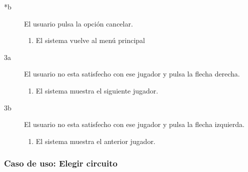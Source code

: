 \begin{description}
\begin{description}
            \item[*b ] El usuario pulsa la opción cancelar.
            \begin{enumerate}
                \item El sistema vuelve al menú principal
            \end{enumerate}
            
            \item[3a ] El usuario no esta satisfecho con ese jugador y pulsa la flecha derecha.
            \begin{enumerate}
                \item El sistema muestra el siguiente jugador.
            \end{enumerate}

            \item[3b ] El usuario no esta satisfecho con ese jugador y pulsa la flecha izquierda.
            \begin{enumerate}
                \item El sistema muestra el anterior jugador.
            \end{enumerate}
            
        \end{description}
\end{description}

\subsubsection{Caso de uso: Elegir circuito}

